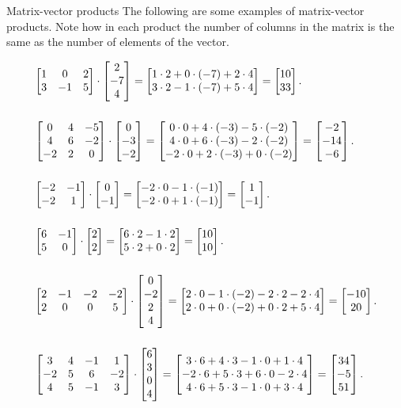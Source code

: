 \vspace{2em}
\begin{example}{Matrix-vector products}{}
	The following are some examples of matrix-vector products. Note how in each product the number of columns in the matrix is the same as the number of elements of the vector.

	\begin{align*}
		&\begin{bmatrix}1 & 0 & 2\\3 & -1 & 5\end{bmatrix}\cdot\colvec{2;-7;4} = \colvec{1\cdot2+0\cdot(-7)+2\cdot4;3\cdot2-1\cdot(-7)+5\cdot4} = \colvec{10;33}.\\[5mm]
		&\begin{bmatrix}0 & 4 & -5\\4 & 6 & -2\\-2 & 2 & 0\\\end{bmatrix} \cdot \colvec{0;-3;-2} = \colvec{0\cdot0+4\cdot(-3)-5\cdot(-2);4\cdot0+6\cdot(-3)-2\cdot(-2);-2\cdot0+2\cdot(-3)+0\cdot(-2)} = \colvec{-2;-14;-6}.\\[5mm]
		&\begin{bmatrix}-2 & -1\\-2 & 1\\\end{bmatrix} \cdot \colvec{0;-1} = \colvec{-2\cdot0-1\cdot(-1);-2\cdot0+1\cdot(-1)} = \colvec{1;-1}.\\[5mm]
		&\begin{bmatrix}6 & -1\\5 & 0\\\end{bmatrix} \cdot \colvec{2;2} = \colvec{6\cdot2-1\cdot2;5\cdot2+0\cdot2} = \colvec{10;10}.\\[5mm]
		&\begin{bmatrix}2 & -1 & -2 & -2\\2 & 0 & 0 & 5\\\end{bmatrix} \cdot \colvec{0;-2;2;4} = \colvec{2\cdot0-1\cdot(-2)-2\cdot2-2\cdot4;2\cdot0+0\cdot(-2)+0\cdot2+5\cdot4} = \colvec{-10;20}.\\[5mm]
		&\begin{bmatrix}3 & 4 & -1 & 1\\-2 & 5 & 6 & -2\\4 & 5 & -1 & 3\\\end{bmatrix} \cdot \colvec{6;3;0;4} = \colvec{3\cdot6+4\cdot3-1\cdot0+1\cdot4;-2\cdot6+5\cdot3+6\cdot0-2\cdot4;4\cdot6+5\cdot3-1\cdot0+3\cdot4} = \colvec{34;-5;51}.
	\end{align*}
\end{example}

